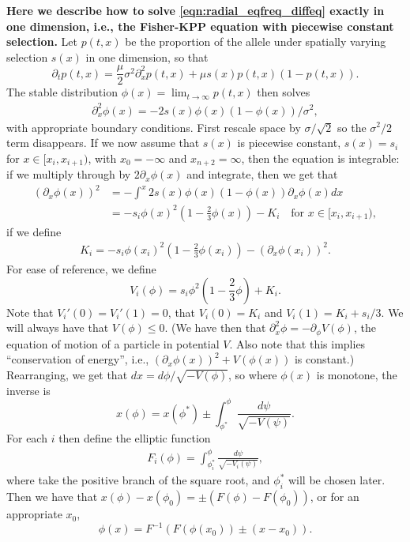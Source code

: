 \documentclass[10pt,letterpaper]{article}
\begin{document}
\textbf{
Here we describe how to solve \eqref{eqn:radial_eqfreq_diffeq} exactly in one dimension,
i.e., the Fisher-KPP equation with piecewise constant selection.
}
Let $p(t,x)$ be the proportion of the allele under spatially varying selection $s(x)$ in one dimension,
so that 
\[
\partial_t p(t,x) = \frac{\mu}{2} \sigma^2 \partial_x^2 p(t,x) + \mu s(x) p(t,x) (1-p(t,x)) .
\]
The stable distribution $\phi(x) = \lim_{t\to\infty} p(t,x)$ then solves
\begin{align} \label{eqn:definingphi}
    \partial_x^2 \phi(x) = - 2 s(x) \phi(x) (1-\phi(x)) /\sigma^2,
\end{align}
with appropriate boundary conditions.
First rescale space by $\sigma/\sqrt{2}$ so the $\sigma^2/2$ term disappears.
If we now assume that $s(x)$ is piecewise constant,
$s(x) = s_i$ for $x \in [x_i,x_{i+1})$, with $x_0=-\infty$ and $x_{n+2}=\infty$,
then the equation is integrable: if we multiply through by $2\partial_x \phi(x)$ and integrate, then we get that
\begin{align} \label{eqn:conservation}
    ( \partial_x \phi(x) )^2  &= - \int^{x} 2 s(x) \phi(x) (1-\phi(x)) \partial_x \phi(x) dx \\
        &= - s_i \phi(x)^2 \left( 1 - \frac{2}{3} \phi(x) \right) - K_i \quad \mbox{for } x \in [x_i,x_{i+1}) ,
\end{align}
if we define
\begin{align} 
  K_i = - s_i \phi(x_i)^2 \left( 1 - \frac{2}{3} \phi(x_i) \right) - ( \partial_x \phi(x_i) )^2  .
\end{align}
For ease of reference, we define
\[
        V_i(\phi) = s_i \phi^2 \left( 1 - \frac{2}{3} \phi \right) + K_i .
\]
Note that $V_i'(0)=V_i'(1)=0$, that $V_i(0)=K_i$ and $V_i(1) = K_i+s_i/3$.  
We will always have that $V(\phi) \le 0$.
(We have then that $\partial_x^2 \phi = - \partial_\phi V(\phi)$, the equation of motion of a particle in potential $V$.
Also note that this implies ``conservation of energy'', i.e., $( \partial_x \phi(x) )^2 + V(\phi(x))$ is constant.)
Rearranging, we get that $dx = d\phi / \sqrt{-V(\phi)}$, so where $\phi(x)$ is monotone, the inverse is
\[
    x(\phi) = x(\phi^*) \pm \int_{\phi^*}^\phi \frac{ d\psi }{ \sqrt{ -V(\psi) } } .
\]
For each $i$ then define the elliptic function
\begin{align}  \label{eqn:elliptic_function}
    F_i(\phi) = \int_{\phi_i^*}^\phi \frac{ d\psi }{ \sqrt{ -V_i(\psi) } } ,
\end{align}
where take the positive branch of the square root, and $\phi_i^*$ will be chosen later.
Then we have that
$x(\phi) - x(\phi_0) = \pm( F(\phi) - F(\phi_0))$,
or for an appropriate $x_0$,
\[
    \phi(x) = F^{-1}\left( F(\phi(x_0)) \pm (x - x_0) \right).
\]
\end{document}

